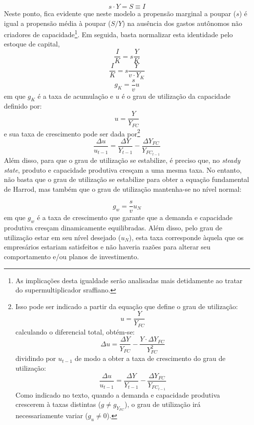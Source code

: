 $$
s\cdot Y = S \equiv I
$$
Neste ponto, fica evidente que neste modelo a propensão marginal a poupar ($s$) é igual a propensão média à poupar ($S/Y$) na ausência dos gastos autônomos não criadores de capacidade\footnote{As implicações desta igualdade serão analisadas mais detidamente ao tratar do supermultiplicador sraffiano.}. Em seguida, basta normalizar esta identidade pelo estoque de capital,
$$
\frac{I}{K} = s\frac{Y}{K}
$$
$$
\frac{I}{K} = s\frac{Y}{v\cdot Y_K}
$$
\begin{equation}
    g_K = \frac{s}{v}u
\end{equation}
em que $g_K$ é a taxa de acumulação e $u$ é o grau de utilização da capacidade definido por:
$$
u = \frac{Y}{Y_{FC}}
$$
e sua taxa de crescimento pode ser dada por\footnote{Isso pode ser indicado a partir da equação que define o grau de utilização:
	$$
	u = \frac{Y}{Y_{FC}}
	$$
	calculando o diferencial total, obtém-se:
	$$
	\Delta u = \frac{\Delta Y}{ Y_{FC}} - \frac{Y\cdot \Delta Y_{FC}}{Y_{FC}^2}
	$$
	dividindo por $u_{t-1}$ de modo a obter a taxa de crescimento do grau de utilização:
	$$
	\frac{\Delta u}{u_{t-1}} = \frac{\Delta Y}{Y_{t-1}} - \frac{\Delta Y_{FC}}{Y_{FC_{t-1}}}
	$$
	Como indicado no texto, quando a demanda e capacidade produtiva crescerem à taxas distintas ($g \neq g_{Y_{FC}}$), o grau de utilização irá necessariamente variar ($g_u \neq 0$).
}
$$
\frac{\Delta u}{u_{t-1}} = \frac{\Delta Y}{Y_{t-1}} - \frac{\Delta Y_{FC}}{Y_{FC_{t-1}}}
$$
Além disso, para que o grau de utilização se estabilize, é preciso que, no \textit{steady state}, produto e capacidade produtiva cresçam a uma mesma taxa. 
No entanto, não basta que o grau de utilização se estabilize para obter a equação fundamental de Harrod, mas também que o grau de utilização mantenha-se no nível normal:

\begin{equation}
    \label{Fundamental}
    g_w = \frac{s}{v}u_N
\end{equation}
em que $g_w$ é a taxa de crescimento que garante que a demanda e capacidade produtiva cresçam dinamicamente equilibradas. Além disso, pelo grau de utilização estar em seu nível desejado ($u_N$), esta taxa corresponde àquela que os empresários estariam satisfeitos e não haveria razões para alterar seu comportamento e/ou planos de investimento. 


